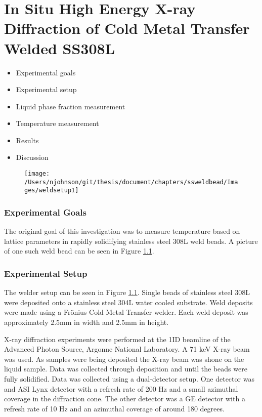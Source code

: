 \chapter{In Situ High Energy X-ray Diffraction of Cold Metal Transfer Welded SS308L}


\begin{itemize}
	\item Experimental goals
	\item Experimental setup
	\item Liquid phase fraction measurement
	\item Temperature measurement
	\item Results
	\item Discussion
\end{itemize}

\begin{figure}
	\texttt{[image: /Users/njohnson/git/thesis/document/chapters/ssweldbead/Images/weldsetup1]}
	\caption{}
	\label{weldsetup1}
\end{figure}

\subsection{Experimental Goals}
The original goal of this investigation was to measure temperature based on lattice parameters in rapidly solidifying stainless steel 308L weld beads. A picture of one such weld bead can be seen in Figure \ref{weldsetup1}. 

\subsection{Experimental Setup}
The welder setup can be seen in Figure \ref{weldsetup1}. Single beads of stainless steel 308L were deposited onto a stainless steel 304L water cooled substrate. Weld deposits were made using a Fr\"onius Cold Metal Transfer welder. Each weld deposit was approximately 2.5mm in width and 2.5mm in height. 

X-ray diffraction experiments were performed at the 1ID beamline of the Advanced Photon Source, Argonne National Laboratory. A 71 keV X-ray beam was used. As samples were being deposited the X-ray beam was shone on the liquid sample. Data was collected through deposition and until the beads were fully solidified. Data was collected using a dual-detector setup. One detector was and ASI Lynx detector \cite{LynX} with a refresh rate of 200 Hz and a small azimuthal coverage in the diffraction cone. The other detector was a GE detector with a refresh rate of 10 Hz and an azimuthal coverage of around 180 degrees. 

